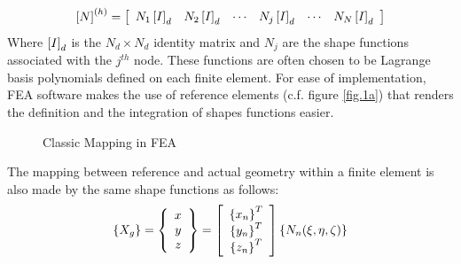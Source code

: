 \begin{equation}
\label{eq.1.12}
\left[{N}\right]^{(h)}=\left[ \begin{array}{cccccc}
N_1\left[{I}\right]_d&N_2\left[{I}\right]_d& \cdots&N_j\left[{I}\right]_d&\cdots&N_N\left[{I}\right]_d
\end{array} \right]
\end{equation}
Where $\left[{I}\right]_d$ is the $N_d \times N_d$ identity matrix and $N_j$ are the shape functions associated with the $j^{th}$ node. These functions are often chosen to be Lagrange basis polynomials defined on each finite element. For ease of implementation, FEA software makes the use of reference elements (c.f. figure \ref{fig.1a}) that renders the definition and the integration of shapes functions easier. 
\begin{figure}[!ht]
     \caption{Classic Mapping in FEA}
     \label{fig.1.2}
   \end{figure}
The mapping between reference and actual geometry within a finite element is also made by the same shape functions as follows:
\begin{equation}
\label{eq.1.16}
\left\lbrace{X_g}\right \rbrace=\left\lbrace{\begin{array}{c}
x\\y\\z
\end{array}}\right \rbrace=\left[{\begin{array}{c}\left\lbrace{x_n}\right \rbrace^T\\\left\lbrace{y_n}\right \rbrace^T\\\left\lbrace{z_n}\right \rbrace^T\end{array}}\right]\left\lbrace{N_n(\xi,\eta,\zeta)}\right \rbrace
\end{equation}
